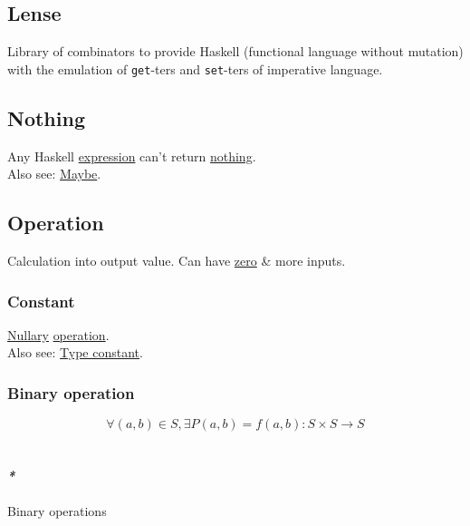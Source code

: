 \documentclass[11pt]{article}
\begin{document}
\subsection{\label{orgb4b31e1}Lense}
\label{sec:org1846268}
Library of combinators to provide Haskell (functional language without mutation) with the emulation of \texttt{get}-ters and \texttt{set}-ters of imperative language.\\

\subsection{\label{org35c2c9d}Nothing}
\label{sec:orgd6f089e}
Any Haskell \hyperref[org9021dd7]{expression} can't return \hyperref[org35c2c9d]{nothing}.\\

Also see: \hyperref[org8347bae]{Maybe}.\\

\subsection{\label{org1173fe8}Operation}
\label{sec:orgee47e1c}
Calculation into output value. Can have \hyperref[org5d1963a]{zero} \& more inputs.\\

\subsubsection{\label{org74b57ec}Constant}
\label{sec:org62d3de3}
\hyperref[org2fb9b13]{Nullary} \hyperref[org1173fe8]{operation}.\\

Also see: \hyperref[org21f5cab]{Type constant}.\\

\subsubsection{\label{orga030476}Binary operation}
\label{sec:org06ee2b3}
$$ \forall (a,b) \in S, \exists P(a,b)=f(a,b): S \times S \to S $$\\

\paragraph{\emph{*}}
\label{sec:orgca0f93b}

\label{org1f69dbb}Binary operations\\
\end{document}
